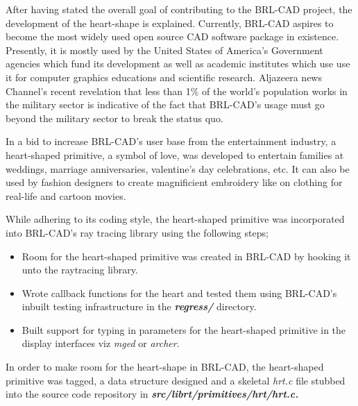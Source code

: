 \hspace{30} After   having   stated   the overall   goal   of   contributing   to   the   BRL-­CAD   
project, the development of the heart-shape is explained. Currently,  
BRL­-CAD   aspires   to   become   the   most   widely   used   open   source  
CAD   software   package   in   existence.   Presently,   it   is   mostly  
used   by   the   United   States   of   America's   Government   agencies   which   fund   its  
development   as   well   as   academic   institutes   which   use   use   it   for   computer  
graphics   educations   and   scientific   research.   Aljazeera   news   Channel's   recent  
revelation   that   less   than   1\%   of   the   world's   population   works   in   the   military   sector  
is   indicative   of   the   fact   that   BRL-­CAD's   usage   must   go   beyond   the   military  
sector to break the status­ quo.   

\hspace{30} In a bid to increase BRL-­CAD's user base from the entertainment industry, 
a heart-­shaped primitive, a symbol of love, was developed to entertain families at weddings,
 marriage   anniversaries,   valentine's   day   celebrations,   etc. It can also be used by
 fashion   designers   to   create   magnificient   embroidery like on  
clothing for real-life and cartoon movies.   

\hspace{30} While   adhering   to   its   coding   style,  the heart-­shaped  
primitive was incorporated into BRL­-CAD's ray tracing library using the following steps;  

\begin{itemize}
\item Room for the heart-shaped primitive was created in BRL­-CAD by hooking it unto the raytracing library.  
\item Wrote callback   functions   for   the   heart   and   tested   them   using   BRL-­CAD's  
inbuilt testing infrastructure in the \textit{\textbf{regress/}} directory.  
\item Built   support   for   typing   in   parameters   for   the   heart­-shaped   primitive   in   the  
display interfaces viz \textit{mged} or \textit{archer}.
\end{itemize}

In   order   to   make   room   for   the   heart­-shape   in   BRL-­CAD, the   heart-shaped  
primitive was tagged, a data   structure designed and  a skeletal   \textit{hrt.c}   file stubbed  into  
the source code repository in \textbf{\textit{src/librt/primitives/hrt/hrt.c.}}

